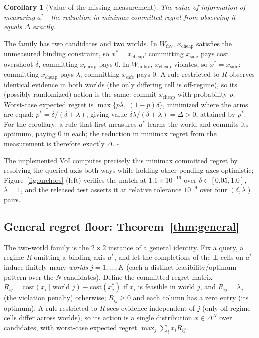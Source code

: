 \documentclass{article} %
\newtheorem{corollary}{Corollary}
\newcommand{\bbot}{\bot}
\begin{document}
\begin{corollary}[Value of the missing measurement]
\label{cor:voi}
The value of information of measuring $a^*$---the reduction in minimax committed regret from observing it---equals $\Delta$ exactly.
\end{corollary}

The family has two candidates and two worlds. In $W_{\mathrm{fav}}$, $x_{\mathrm{cheap}}$ satisfies the unmeasured binding constraint, so $x^* = x_{\mathrm{cheap}}$: committing $x_{\mathrm{safe}}$ pays cost overshoot $\delta$, committing $x_{\mathrm{cheap}}$ pays $0$. In $W_{\mathrm{unfav}}$, $x_{\mathrm{cheap}}$ violates, so $x^* = x_{\mathrm{safe}}$: committing $x_{\mathrm{cheap}}$ pays $\lambda$, committing $x_{\mathrm{safe}}$ pays $0$. A rule restricted to $R$ observes identical evidence in both worlds (the only differing cell is off-regime), so its (possibly randomized) action is the same: commit $x_{\mathrm{cheap}}$ with probability $p$. Worst-case expected regret is $\max\{p\lambda,\ (1-p)\delta\}$, minimized where the arms are equal: $p^* = \delta/(\delta+\lambda)$, giving value $\delta\lambda/(\delta+\lambda) = \Delta > 0$, attained by $p^*$. For the corollary: a rule that first measures $a^*$ learns the world and commits its optimum, paying $0$ in each; the reduction in minimax regret from the measurement is therefore exactly $\Delta$. \hfill$\square$

The implemented VoI computes precisely this minimax committed regret by resolving the queried axis both ways while holding other pending axes optimistic; Figure~\ref{fig:anchors} (left) verifies the match at $1.1 \times 10^{-16}$ over $\delta \in [0.05, 1.0]$, $\lambda = 1$, and the released test asserts it at relative tolerance $10^{-9}$ over four $(\delta,\lambda)$ pairs.

\subsection{General regret floor: Theorem~\ref{thm:general}}
\label{app:general}
The two-world family is the $2\times 2$ instance of a general identity. Fix a query, a regime $R$ omitting a binding axis $a^*$, and let the completions of the $\bbot$ cells on $a^*$ induce finitely many \emph{worlds} $j=1,\dots,K$ (each a distinct feasibility/optimum pattern over the $N$ candidates). Define the committed-regret matrix $R_{ij} = \mathrm{cost}(x_i \mid \text{world } j) - \mathrm{cost}(x^*_j)$ if $x_i$ is feasible in world $j$, and $R_{ij} = \lambda_{j}$ (the violation penalty) otherwise; $R_{ij}\ge 0$ and each column has a zero entry (its optimum). A rule restricted to $R$ sees evidence independent of $j$ (only off-regime cells differ across worlds), so its action is a single distribution $x\in\Delta^{N}$ over candidates, with worst-case expected regret $\max_j \sum_i x_i R_{ij}$.
\end{document}
